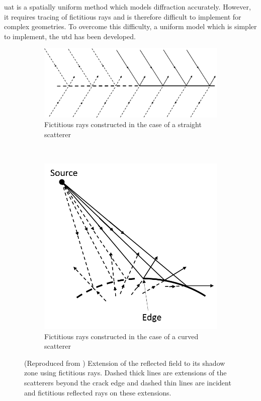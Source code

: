 \acrshort{uat} is a spatially uniform method which models diffraction accurately. However, it requires tracing of fictitious rays and is therefore difficult to implement for complex geometries. To overcome this difficulty, a uniform model which is simpler to implement, the \acrfull{utd} has been developed.

\begin{figure}[h]
    \centering
    \begin{subfigure}[b]{0.45\textwidth}
        \includegraphics[width=\textwidth]{images/chapter1/FictitiousStraight.png}
        \caption{Fictitious rays constructed in the case of a straight scatterer}
        \label{Straightfict}
    \end{subfigure}
    ~ 
    \begin{subfigure}[b]{0.45\textwidth}
        \includegraphics[width=\textwidth]{images/chapter1/FictitiousCurved.png}
        \caption{Fictitious rays constructed in the case of a curved scatterer}
        \label{Curvedfict}
    \end{subfigure}
    \caption{(Reproduced from \cite{Bouche,Molinet}) Extension of the reflected field to its shadow zone using fictitious rays. Dashed thick lines are extensions of the scatterers beyond the crack edge and dashed thin lines are incident and fictitious reflected rays on these extensions.}
    \label{FictRays}
\end{figure}


